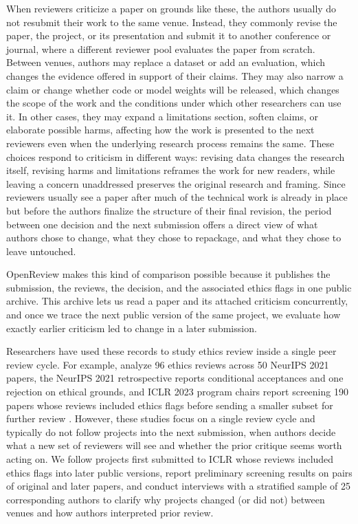 \documentclass[sigconf,nonacm]{acmart} %
\begin{document}
When reviewers criticize a paper on grounds like these, the authors usually do not resubmit their work to the same venue. Instead, they commonly revise the paper, the project, or its presentation and submit it to another conference or journal, where a different reviewer pool evaluates the paper from scratch. Between venues, authors may replace a dataset or add an evaluation, which changes the evidence offered in support of their claims. They may also narrow a claim or change whether code or model weights will be released, which changes the scope of the work and the conditions under which other researchers can use it. In other cases, they may expand a limitations section, soften claims, or elaborate possible harms, affecting how the work is presented to the next reviewers even when the underlying research process remains the same. These choices respond to criticism in different ways: revising data changes the research itself, revising harms and limitations reframes the work for new readers, while leaving a concern unaddressed preserves the original research and framing. Since reviewers usually see a paper after much of the technical work is already in place but before the authors finalize the structure of their final revision, the period between one decision and the next submission offers a direct view of what authors chose to change, what they chose to repackage, and what they chose to leave untouched.

OpenReview makes this kind of comparison possible because it publishes the submission, the reviews, the decision, and the associated ethics flags in one public archive. This archive lets us read a paper and its attached criticism concurrently, and once we trace the next public version of the same project, we evaluate how exactly earlier criticism led to change in a later submission. 

Researchers have used these records to study ethics review inside a single peer review cycle. For example, \citet{liu2022examining} analyze 96 ethics reviews across 50 NeurIPS 2021 papers, the NeurIPS 2021 retrospective reports conditional acceptances and one rejection on ethical grounds, and ICLR 2023 program chairs report screening 190 papers whose reviews included ethics flags before sending a smaller subset for further review \citep{liu2022examining,neurips2021retrospective,iclr2023ethics}. However, these studies focus on a single review cycle and typically do not follow projects into the next submission, when authors decide what a new set of reviewers will see and whether the prior critique seems worth acting on. We follow projects first submitted to ICLR whose reviews included ethics flags into later public versions, report preliminary screening results on pairs of original and later papers, and conduct interviews with a stratified sample of 25 corresponding authors to clarify why projects changed (or did not) between venues and how authors interpreted prior review.
\end{document}
